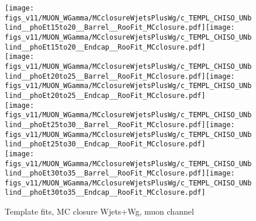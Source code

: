 \begin{figure}[htb]
  \begin{center}
   \texttt{[image: figs\_v11/MUON\_WGamma/MCclosureWjetsPlusWg/c\_TEMPL\_CHISO\_UNblind\_\_phoEt15to20\_\_Barrel\_\_RooFit\_MCclosure.pdf]}\texttt{[image: figs\_v11/MUON\_WGamma/MCclosureWjetsPlusWg/c\_TEMPL\_CHISO\_UNblind\_\_phoEt15to20\_\_Endcap\_\_RooFit\_MCclosure.pdf]}\\
   \texttt{[image: figs\_v11/MUON\_WGamma/MCclosureWjetsPlusWg/c\_TEMPL\_CHISO\_UNblind\_\_phoEt20to25\_\_Barrel\_\_RooFit\_MCclosure.pdf]}\texttt{[image: figs\_v11/MUON\_WGamma/MCclosureWjetsPlusWg/c\_TEMPL\_CHISO\_UNblind\_\_phoEt20to25\_\_Endcap\_\_RooFit\_MCclosure.pdf]}\\
   \texttt{[image: figs\_v11/MUON\_WGamma/MCclosureWjetsPlusWg/c\_TEMPL\_CHISO\_UNblind\_\_phoEt25to30\_\_Barrel\_\_RooFit\_MCclosure.pdf]}\texttt{[image: figs\_v11/MUON\_WGamma/MCclosureWjetsPlusWg/c\_TEMPL\_CHISO\_UNblind\_\_phoEt25to30\_\_Endcap\_\_RooFit\_MCclosure.pdf]}\\
   \texttt{[image: figs\_v11/MUON\_WGamma/MCclosureWjetsPlusWg/c\_TEMPL\_CHISO\_UNblind\_\_phoEt30to35\_\_Barrel\_\_RooFit\_MCclosure.pdf]}\texttt{[image: figs\_v11/MUON\_WGamma/MCclosureWjetsPlusWg/c\_TEMPL\_CHISO\_UNblind\_\_phoEt30to35\_\_Endcap\_\_RooFit\_MCclosure.pdf]}\\
  \label{fig:templateFits_MCclosureWjetsPlusWg_CHISO_MUON_1}
  \caption{Template fits, MC closure Wjets+Wg, muon channel}
  \end{center}
\end{figure}

